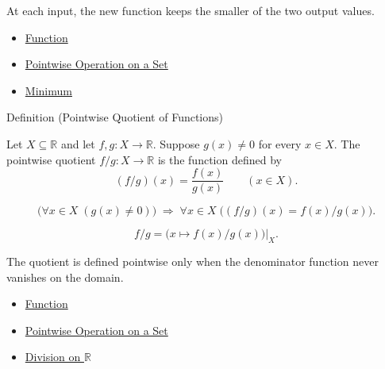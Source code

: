 \begin{remark*}[Interpretation]
At each input, the new function keeps the smaller of the two output values.
\end{remark*}

\begin{dependencies}
\begin{itemize}
  \item \hyperref[def:function]{Function}
  \item \hyperref[def:pointwise-operation-on-set]{Pointwise Operation on a Set}
  \item \hyperref[def:minimum]{Minimum}
\end{itemize}
\end{dependencies}

\begin{definitionbox}{Definition (Pointwise Quotient of Functions)}
\begin{definition}
\label{def:pointwise-quotient-of-functions}
Let $X\subseteq\mathbb{R}$ and let $f,g:X\to\mathbb{R}$.  Suppose
$g(x)\neq 0$ for every $x\in X$.  The pointwise quotient $f/g:X\to\mathbb{R}$
is the function defined by
\[
  (f/g)(x)=\frac{f(x)}{g(x)}
  \qquad (x\in X).
\]
\end{definition}
\end{definitionbox}

\begin{remark*}
\[
  \bigl(\forall x\in X\;(g(x)\neq 0)\bigr)
  \;\Longrightarrow\;
  \forall x\in X\;\bigl((f/g)(x)=f(x)/g(x)\bigr).
\]
\end{remark*}

\begin{remark*}
\[
  f/g
  =
  \bigl(x\mapsto f(x)/g(x)\bigr)\big|_{X}.
\]
\end{remark*}

\begin{remark*}[Interpretation]
The quotient is defined pointwise only when the denominator function never
vanishes on the domain.
\end{remark*}

\begin{dependencies}
\begin{itemize}
  \item \hyperref[def:function]{Function}
  \item \hyperref[def:pointwise-operation-on-set]{Pointwise Operation on a Set}
  \item \hyperref[def:division-on-r]{Division on $\mathbb{R}$}
\end{itemize}
\end{dependencies}

